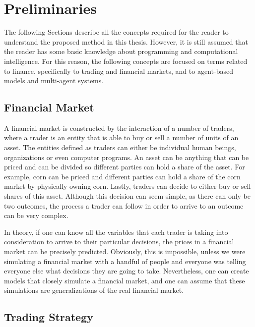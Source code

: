 \chapter{Preliminaries}
\label{chapter:preliminaries}

The following Sections describe all the concepts required for the reader to
understand the proposed method in this thesis. However, it is still assumed that
the reader has some basic knowledge about programming and computational
intelligence. For this reason, the following concepts are focused on terms
related to finance, specifically to trading and financial markets, and to
agent-based models and multi-agent systems.

\section{Financial Market}
\label{section:financial-market}

A financial market is constructed by the interaction of a number of traders,
where a trader is an entity that is able to buy or sell a number of units of an
asset. The entities defined as traders can either be individual human beings,
organizations or even computer programs. An asset can be anything that can be
priced and can be divided so different parties can hold a share of the
asset. For example, corn can be priced and different parties can hold a share of
the corn market by physically owning corn. Lastly, traders can decide to either
buy or sell shares of this asset. Although this decision can seem simple, as
there can only be two outcomes, the process a trader can follow in order to
arrive to an outcome can be very complex.

In theory, if one can know all the variables that each trader is taking into
consideration to arrive to their particular decisions, the prices in a financial
market can be precisely predicted. Obviously, this is impossible, unless we were
simulating a financial market with a handful of people and everyone was telling
everyone else what decisions they are going to take. Nevertheless, one can
create models that closely simulate a financial market, and one can assume that
these simulations are generalizations of the real financial market.

\section{Trading Strategy}
\label{section:trading-strategy}


